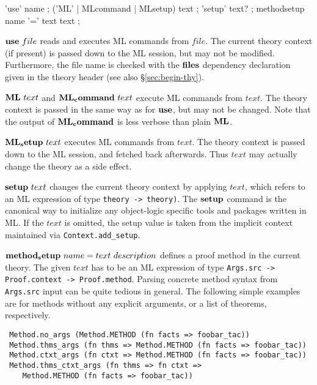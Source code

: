 
\begin{rail}
  'use' name
  ;
  ('ML' | MLcommand | MLsetup) text
  ;
  'setup' text?
  ;
  methodsetup name '=' text text
  ;
\end{rail}

\begin{descr}
\item [${\mathord{\mathbf{use}}}~file$] reads and executes ML commands from $file$.
  The current theory context (if present) is passed down to the ML session,
  but may not be modified.  Furthermore, the file name is checked with the
  ${\mathord{\mathbf{files}}}$ dependency declaration given in the theory header (see
  also \S\ref{sec:begin-thy}).
  
\item [${\mathord{\mathbf{ML}}}~text$ and ${\mathord{\mathbf{ML_command}}}~text$] execute ML
  commands from $text$.  The theory context is passed in the same way as for
  ${\mathord{\mathbf{use}}}$, but may not be changed.  Note that the output of
  ${\mathord{\mathbf{ML_command}}}$ is less verbose than plain ${\mathord{\mathbf{ML}}}$.
  
\item [${\mathord{\mathbf{ML_setup}}}~text$] executes ML commands from $text$.  The
  theory context is passed down to the ML session, and fetched back
  afterwards.  Thus $text$ may actually change the theory as a side effect.
  
\item [${\mathord{\mathbf{setup}}}~text$] changes the current theory context by
  applying $text$, which refers to an ML expression of type
  \texttt{theory~->~theory)}.  The ${\mathord{\mathbf{setup}}}$ command is the
  canonical way to initialize any object-logic specific tools and packages
  written in ML.  If the $text$ is omitted, the setup value is taken from the
  implicit context maintained via \verb,Context.add_setup,.
  
\item [${\mathord{\mathbf{method_setup}}}~name = text~description$] defines a proof
  method in the current theory.  The given $text$ has to be an ML expression
  of type \texttt{Args.src -> Proof.context -> Proof.method}.  Parsing
  concrete method syntax from \texttt{Args.src} input can be quite tedious in
  general.  The following simple examples are for methods without any explicit
  arguments, or a list of theorems, respectively.

{\footnotesize
\begin{verbatim}
 Method.no_args (Method.METHOD (fn facts => foobar_tac))
 Method.thms_args (fn thms => Method.METHOD (fn facts => foobar_tac))
 Method.ctxt_args (fn ctxt => Method.METHOD (fn facts => foobar_tac))
 Method.thms_ctxt_args (fn thms => fn ctxt =>
    Method.METHOD (fn facts => foobar_tac))
\end{verbatim}
}


\end{descr}
